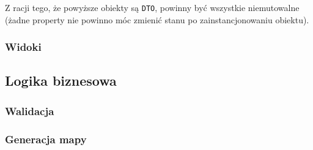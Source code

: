 \documentclass[a4paper, 10pt, titlepage]{article}
\newcommand{\code}[1]{\texttt{#1}}
\begin{document}
Z racji tego, że powyższe obiekty są \code{DTO}, powinny być wszystkie niemutowalne (żadne property nie powinno móc zmienić stanu po zainstancjonowaniu obiektu).

\subsubsection{Widoki}

\subsection{Logika biznesowa}

\subsubsection{Walidacja}

\subsubsection{Generacja mapy}
\end{document}

